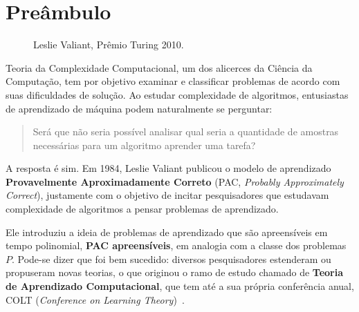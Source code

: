 \documentclass[
10pt, %
a4paper, %
onecolumn, %
]{article}
\begin{document}
\pagestyle{myheadings} %
\markright{\papertitle} %


\thispagestyle{plain} %

\printtitle %


\section{Preâmbulo} 

\begin{figure}
    \caption{Leslie Valiant, Prêmio Turing 2010.}
    \label{leslie}
\end{figure}

Teoria da Complexidade Computacional, um dos alicerces da Ciência da Computação, tem por objetivo examinar e classificar problemas de acordo com suas dificuldades de solução. Ao estudar complexidade de algoritmos, entusiastas de aprendizado de máquina podem naturalmente se perguntar: \begin{quotation}Será que não seria possível analisar qual seria a quantidade de amostras necessárias para um algoritmo aprender uma tarefa?\end{quotation}
    
A resposta é sim. Em 1984, Leslie Valiant publicou o modelo de aprendizado \textbf{Provavelmente Aproximadamente Correto} (PAC, \emph{Probably Approximately Correct})\cite{Valiant1984}, justamente com o objetivo de incitar pesquisadores que estudavam complexidade de algoritmos a pensar problemas de aprendizado. 

Ele introduziu a ideia de problemas de aprendizado que são apreensíveis em tempo polinomial, \textbf{PAC apreensíveis}, em analogia com a classe dos problemas $P$. Pode-se dizer que foi bem sucedido:  diversos pesquisadores estenderam ou propuseram novas teorias, o que originou o ramo de estudo chamado de \textbf{Teoria de Aprendizado Computacional}, que tem até a sua própria conferência anual, COLT (\emph{Conference on Learning Theory})~\cite{COLT}.
\end{document}

